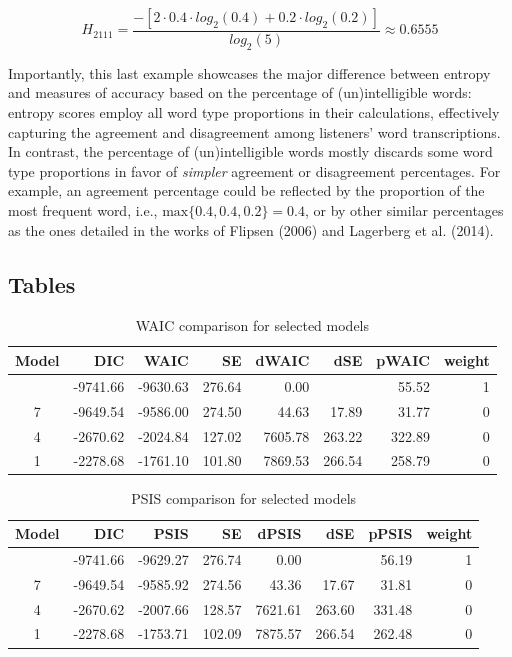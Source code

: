 \documentclass[
sn-apacite
]{sn-jnl}
\begin{document}
\[
H_{2111} = \frac{ -\left[ 2 \cdot 0.4 \cdot log_{2}(0.4) + 0.2 \cdot log_{2}(0.2) \right] }{ log_{2}(5)} \approx 0.6555
\]

{Importantly, this last example showcases the major difference between
entropy and measures of accuracy based on the percentage of
(un)intelligible words: entropy scores employ all word type proportions
in their calculations, effectively capturing the agreement and
disagreement among listeners' word transcriptions. In contrast, the
percentage of (un)intelligible words mostly discards some word type
proportions in favor of \emph{simpler} agreement or disagreement
percentages. For example, an agreement percentage could be reflected by
the proportion of the most frequent word, i.e.,
\(\text{max}\{ 0.4, 0.4, 0.2 \}=0.4\), or by other similar percentages
as the ones detailed in the works of Flipsen (2006) and Lagerberg et al.
(2014).}

\newpage{}

\subsection{Tables}\label{sec-appB}

\begin{longtable}[]{@{}crrrrrrr@{}}

\caption{\label{tbl-rq1-waic}WAIC comparison for selected models}

\tabularnewline

\toprule\noalign{}
Model & DIC & WAIC & SE & dWAIC & dSE & pWAIC & weight \\
\midrule\noalign{}
\endhead
\bottomrule\noalign{}
\endlastfoot
10 & -9741.66 & -9630.63 & 276.64 & 0.00 & & 55.52 & 1 \\
7 & -9649.54 & -9586.00 & 274.50 & 44.63 & 17.89 & 31.77 & 0 \\
4 & -2670.62 & -2024.84 & 127.02 & 7605.78 & 263.22 & 322.89 & 0 \\
1 & -2278.68 & -1761.10 & 101.80 & 7869.53 & 266.54 & 258.79 & 0 \\

\end{longtable}

\begin{longtable}[]{@{}crrrrrrr@{}}

\caption{\label{tbl-rq1-psis}PSIS comparison for selected models}

\tabularnewline

\toprule\noalign{}
Model & DIC & PSIS & SE & dPSIS & dSE & pPSIS & weight \\
\midrule\noalign{}
\endhead
\bottomrule\noalign{}
\endlastfoot
10 & -9741.66 & -9629.27 & 276.74 & 0.00 & & 56.19 & 1 \\
7 & -9649.54 & -9585.92 & 274.56 & 43.36 & 17.67 & 31.81 & 0 \\
4 & -2670.62 & -2007.66 & 128.57 & 7621.61 & 263.60 & 331.48 & 0 \\
1 & -2278.68 & -1753.71 & 102.09 & 7875.57 & 266.54 & 262.48 & 0 \\

\end{longtable}
\end{document}
